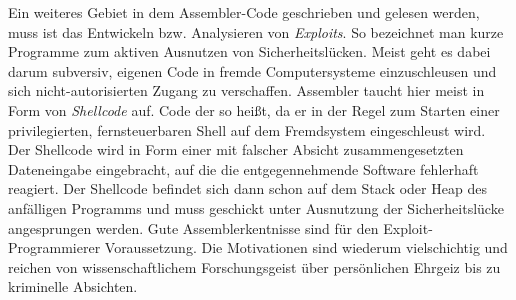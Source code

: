 Ein weiteres Gebiet in dem Assembler-Code geschrieben und gelesen werden, muss ist das Entwickeln bzw. Analysieren von \emph{Exploits}. So bezeichnet man kurze Programme zum aktiven Ausnutzen von Sicherheitslücken. Meist geht es dabei darum subversiv, eigenen Code in fremde Computersysteme einzuschleusen und sich nicht-autorisierten Zugang zu verschaffen. Assembler taucht hier meist in Form von \emph{Shellcode} auf. Code der so heißt, da er in der Regel zum Starten einer privilegierten, fernsteuerbaren Shell auf dem Fremdsystem eingeschleust wird. Der Shellcode wird in Form einer mit falscher Absicht zusammengesetzten Dateneingabe eingebracht, auf die die entgegennehmende Software fehlerhaft reagiert. Der Shellcode befindet sich dann schon auf dem Stack oder Heap des anfälligen Programms und muss geschickt unter Ausnutzung der Sicherheitslücke angesprungen werden. Gute Assemblerkentnisse sind für den Exploit-Programmierer Voraussetzung. Die Motivationen sind wiederum vielschichtig und reichen von wissenschaftlichem Forschungsgeist über persönlichen Ehrgeiz bis zu kriminelle Absichten.
